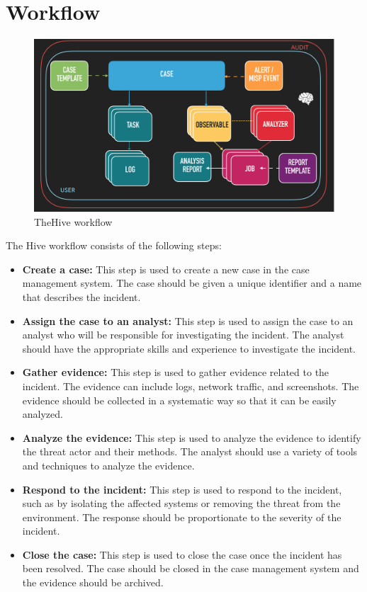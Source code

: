 \documentclass{book}
\begin{document}
\chapter{Workflow}
\bigskip
\bigskip
\begin{figure}[h]
    \centering
    \includegraphics[scale=0.6]{Introductory Images/workflow.png}
    \caption{TheHive workflow}
    \label{fig:hiveworkflow}
\end{figure}
The Hive workflow consists of the following steps:
\begin{itemize}
    \item \textbf{Create a case:} This step is used to create a new case in the case management system. The
case should be given a unique identifier and a name that describes the incident.
    \item \textbf{Assign the case to an analyst:} This step is used to assign the case to an analyst who will
be responsible for investigating the incident. The analyst should have the appropriate skills and
experience to investigate the incident.
    \item\textbf{ Gather evidence:} This step is used to gather evidence related to the incident. The evidence can
include logs, network traffic, and screenshots. The evidence should be collected in a systematic
way so that it can be easily analyzed.
    \item \textbf{Analyze the evidence:} This step is used to analyze the evidence to identify the threat actor
and their methods. The analyst should use a variety of tools and techniques to analyze the
evidence.
    \item \textbf{Respond to the incident:} This step is used to respond to the incident, such as by isolating
the affected systems or removing the threat from the environment. The response should be
proportionate to the severity of the incident.
    \item \textbf{Close the case:} This step is used to close the case once the incident has been resolved. The
case should be closed in the case management system and the evidence should be archived.
\end{itemize}
\end{document}
